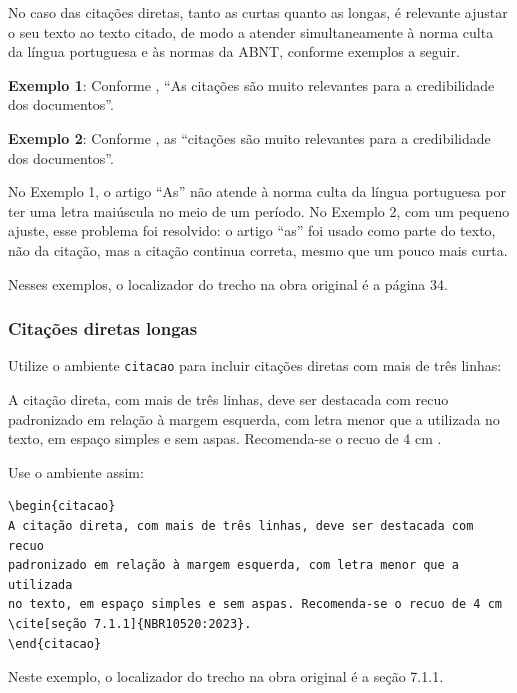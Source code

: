 No caso das citações diretas, tanto as curtas quanto as longas, é relevante ajustar o seu texto ao texto citado, de modo a atender simultaneamente à norma culta da língua portuguesa e às normas da ABNT, conforme exemplos a seguir.

\noindent \textbf{Exemplo 1}: Conforme , ``As citações são muito relevantes para a credibilidade dos documentos''.

\noindent \textbf{Exemplo 2}: Conforme , as ``citações são muito relevantes para a credibilidade dos documentos''.

No Exemplo 1, o artigo ``As'' não atende à norma culta da língua portuguesa por ter uma letra maiúscula no meio de um período. No Exemplo 2, com um pequeno ajuste, esse problema foi resolvido: o artigo ``as'' foi usado como parte do texto, não da citação, mas a citação continua correta, mesmo que um pouco mais curta.

Nesses exemplos, o localizador do trecho na obra original é a página 34.

\subsubsection{Citações diretas longas}

Utilize o ambiente \texttt{citacao} para incluir
citações diretas com mais de três linhas:

\begin{citacao}
A citação direta, com mais de três linhas, deve ser destacada com recuo padronizado em relação à margem esquerda, com letra menor que a utilizada no texto, em espaço simples e sem aspas. Recomenda-se o recuo de 4 cm \cite[seção 7.1.1]{NBR10520:2023}.
\end{citacao}

Use o ambiente assim:

\begin{verbatim}
\begin{citacao}
A citação direta, com mais de três linhas, deve ser destacada com recuo
padronizado em relação à margem esquerda, com letra menor que a utilizada
no texto, em espaço simples e sem aspas. Recomenda-se o recuo de 4 cm
\cite[seção 7.1.1]{NBR10520:2023}.
\end{citacao}
\end{verbatim}

Neste exemplo, o localizador do trecho na obra original é a seção 7.1.1.

